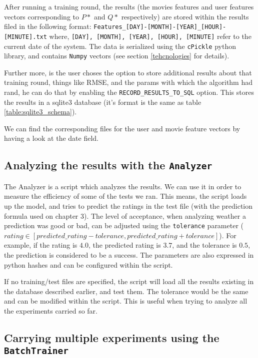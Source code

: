 \documentclass[10pt,a4paper]{article}  %
\begin{document}
After running a training round, the results (the movies features and user features vectors corresponding to $P*$ and $Q*$ respectively) are stored within the results filed in the following format: \texttt{Features\_[DAY]-[MONTH]-[YEAR]\_[HOUR]-[MINUTE].txt} where, \texttt{[DAY], [MONTH], [YEAR], [HOUR], [MINUTE]} refer to the current date of the system. The data is serialized using the \texttt{cPickle} python library, and contains \texttt{Numpy} vectors (see section \ref{tehcnologies} for details). 

Further more, is the user choses the option to store additional results about that training round, things like RMSE, and the params with which the algorithm had rand, he can do that by enabling the \texttt{RECORD\_RESULTS\_TO\_SQL} option. This stores the results in a sqlite3 database (it's format is the same as table \ref{table:sqlite3_schema}). 

We can find the corresponding files for the user and movie feature vectors by having a look at the date field. 

\subsection{Analyzing the results with the \texttt{Analyzer}}

The Analyzer is a script which analyzes the results. We can use it in order to measure the efficiency of some of the tests we ran. This means, the script loads up the model, and tries to predict the ratings in the test file (with the prediction formula used on chapter 3). The level of acceptance, when analyzing weather a prediction was good or bad, can be adjusted using the \texttt{tolerance} parameter ($rating \in [predicted\_rating - tolerance, predicted\_rating + tolerance]$). For example, if the rating is $4.0$, the predicted rating is $3.7$, and the tolerance is $0.5$, the prediction is considered to be a success.  The parameters are also expressed in python hashes and can be configured within the script. 

If no training/test files are specified, the script will load all the results existing in the database described earlier, and test them. The tolerance would be the same and can be modified within the script. This is useful when trying to analyze all the experiments carried so far. 

\subsection{Carrying multiple experiments using the \texttt{BatchTrainer}}
\end{document}
